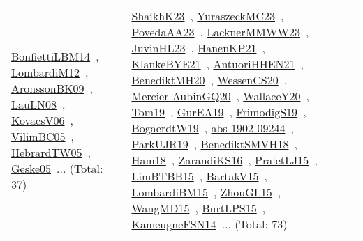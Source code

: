 {\begin{longtable}{lp{3cm}>{\raggedright\arraybackslash}p{6cm}>{\raggedright\arraybackslash}p{6cm}>{\raggedright\arraybackslash}p{8cm}}
\href{works/BonfiettiLBM14.pdf}{BonfiettiLBM14}~\cite{BonfiettiLBM14}, \href{works/LombardiM12.pdf}{LombardiM12}~\cite{LombardiM12}, \href{works/AronssonBK09.pdf}{AronssonBK09}~\cite{AronssonBK09}, \href{works/LauLN08.pdf}{LauLN08}~\cite{LauLN08}, \href{works/KovacsV06.pdf}{KovacsV06}~\cite{KovacsV06}, \href{works/VilimBC05.pdf}{VilimBC05}~\cite{VilimBC05}, \href{works/HebrardTW05.pdf}{HebrardTW05}~\cite{HebrardTW05}, \href{works/Geske05.pdf}{Geske05}~\cite{Geske05}... (Total: 37) & \href{works/ShaikhK23.pdf}{ShaikhK23}~\cite{ShaikhK23}, \href{works/YuraszeckMC23.pdf}{YuraszeckMC23}~\cite{YuraszeckMC23}, \href{works/PovedaAA23.pdf}{PovedaAA23}~\cite{PovedaAA23}, \href{works/LacknerMMWW23.pdf}{LacknerMMWW23}~\cite{LacknerMMWW23}, \href{works/JuvinHL23.pdf}{JuvinHL23}~\cite{JuvinHL23}, \href{works/HanenKP21.pdf}{HanenKP21}~\cite{HanenKP21}, \href{works/KlankeBYE21.pdf}{KlankeBYE21}~\cite{KlankeBYE21}, \href{works/AntuoriHHEN21.pdf}{AntuoriHHEN21}~\cite{AntuoriHHEN21}, \href{works/BenediktMH20.pdf}{BenediktMH20}~\cite{BenediktMH20}, \href{works/WessenCS20.pdf}{WessenCS20}~\cite{WessenCS20}, \href{works/Mercier-AubinGQ20.pdf}{Mercier-AubinGQ20}~\cite{Mercier-AubinGQ20}, \href{works/WallaceY20.pdf}{WallaceY20}~\cite{WallaceY20}, \href{works/Tom19.pdf}{Tom19}~\cite{Tom19}, \href{works/GurEA19.pdf}{GurEA19}~\cite{GurEA19}, \href{works/FrimodigS19.pdf}{FrimodigS19}~\cite{FrimodigS19}, \href{works/BogaerdtW19.pdf}{BogaerdtW19}~\cite{BogaerdtW19}, \href{works/abs-1902-09244.pdf}{abs-1902-09244}~\cite{abs-1902-09244}, \href{works/ParkUJR19.pdf}{ParkUJR19}~\cite{ParkUJR19}, \href{works/BenediktSMVH18.pdf}{BenediktSMVH18}~\cite{BenediktSMVH18}, \href{works/Ham18.pdf}{Ham18}~\cite{Ham18}, \href{works/ZarandiKS16.pdf}{ZarandiKS16}~\cite{ZarandiKS16}, \href{works/PraletLJ15.pdf}{PraletLJ15}~\cite{PraletLJ15}, \href{works/LimBTBB15.pdf}{LimBTBB15}~\cite{LimBTBB15}, \href{works/BartakV15.pdf}{BartakV15}~\cite{BartakV15}, \href{works/LombardiBM15.pdf}{LombardiBM15}~\cite{LombardiBM15}, \href{works/ZhouGL15.pdf}{ZhouGL15}~\cite{ZhouGL15}, \href{works/WangMD15.pdf}{WangMD15}~\cite{WangMD15}, \href{works/BurtLPS15.pdf}{BurtLPS15}~\cite{BurtLPS15}, \href{works/KameugneFSN14.pdf}{KameugneFSN14}~\cite{KameugneFSN14}... (Total: 73)\\

\end{longtable}}
